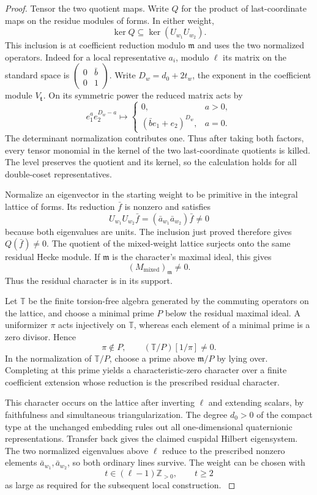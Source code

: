 \begin{proof}
Tensor the two quotient maps. Write \(Q\) for the product of last-coordinate maps
on the residue modules of forms. In either weight,
\[
                   \ker Q\subseteq\ker(U_{w_1}U_{w_2}) .
\]
This inclusion is at coefficient reduction modulo \(\mathfrak m\)
and uses the two normalized operators. Indeed for a local representative \(a_i\), modulo \(\ell\)
its matrix on the standard space is
\(\begin{pmatrix}0&\bar b\\0&1\end{pmatrix}\).
Write \(D_w=d_0+2t_w\), the exponent in the coefficient
module \(V_{\mathbf t}\). On its symmetric power the
reduced matrix acts by
\[
 e_1^a e_2^{D_w-a}\longmapsto
 \begin{cases}
 0,&a>0,\\
 (\bar b e_1+e_2)^{D_w},&a=0 .
 \end{cases}
\]
The determinant normalization contributes one. Thus after
taking both factors, every tensor monomial in the kernel
of the two last-coordinate quotients is killed. The
level preserves the quotient and its kernel, so the
calculation holds for all double-coset representatives.

Normalize an eigenvector in the starting weight to be
primitive in the integral lattice of forms. Its reduction \(\bar f\) is nonzero and satisfies
\[
 U_{w_1}U_{w_2}\bar f
          =(\bar a_{w_1}\bar a_{w_2})\bar f\ne0
\]
because both eigenvalues are units. The inclusion just proved
therefore gives \(Q(\bar f)\ne0\). The quotient of the mixed-weight lattice surjects onto the
same residual Hecke module. If \(\mathfrak m\) is the
character's maximal ideal, this gives
\[
                    (M_{\mathrm{mixed}})_\mathfrak m\ne0 .
\]
Thus the residual character is in its support.

Let \(\mathbb T\) be the finite torsion-free algebra generated by the commuting operators on the lattice, and choose a minimal prime \(P\) below the residual maximal ideal. A uniformizer \(\pi\) acts injectively on \(\mathbb T\), whereas each element of a minimal prime is a zero divisor. Hence
\[
 \pi\notin P,\qquad (\mathbb T/P)[1/\pi]\ne0 .
\]
In the normalization of \(\mathbb T/P\), choose a prime above
\(\mathfrak m/P\) by lying over. Completing at this prime yields
a characteristic-zero character over a finite coefficient extension
whose reduction is the prescribed residual character. 

This character occurs on the lattice after inverting \(\ell\) and extending
scalars, by faithfulness and simultaneous triangularization.
The degree \(d_0>0\) of the compact type at the unchanged
embedding rules out all one-dimensional quaternionic
representations. Transfer back gives the claimed cuspidal
Hilbert eigensystem. The two normalized eigenvalues above \(\ell\) reduce to the
prescribed nonzero elements \(\bar a_{w_1},\bar a_{w_2}\), so both
ordinary lines survive. The weight can be chosen with
\[
                    t\in(\ell-1)\mathbb Z_{>0},\qquad t\ge2
\]
as large as required for the subsequent local construction.
\label{cor:ordinary-mixed-hilbert-1}

\end{proof}

